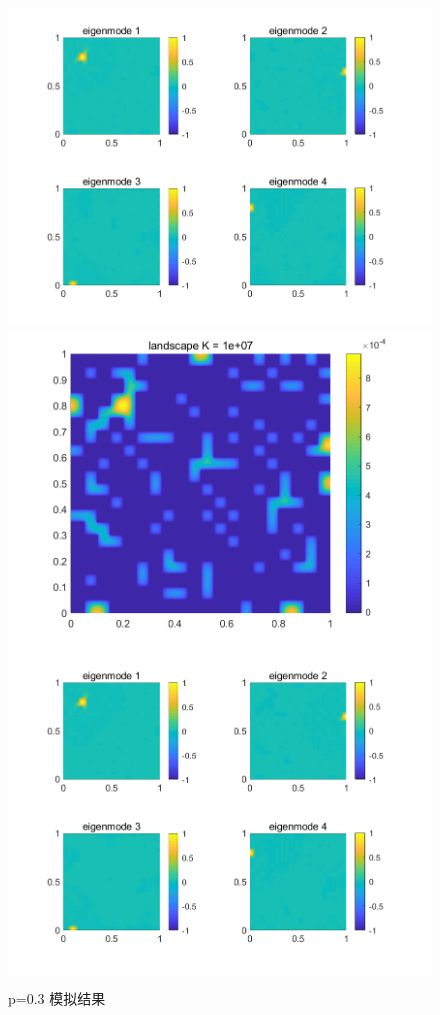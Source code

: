 \documentclass[12pt,a4paper]{article}
\begin{document}
\begin{figure}[htbp]
\includegraphics[width=0.4\linewidth]{potential/P3K3U}
\includegraphics[width=0.4\linewidth]{potential/P3K4W}
\includegraphics[width=0.4\linewidth]{potential/P3K4U}
\caption{p=0.3 模拟结果}
\label{P3}
\end{figure}
\end{document}
